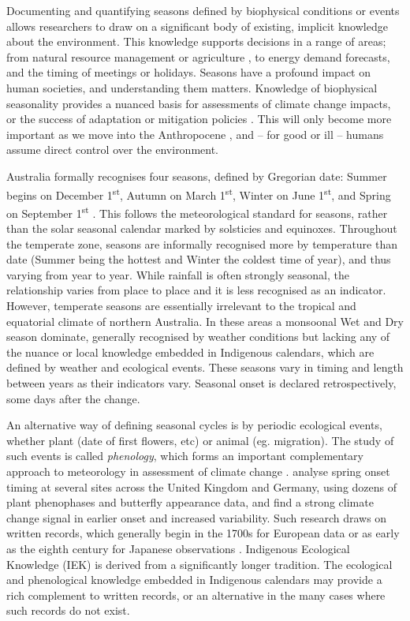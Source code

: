 Documenting and quantifying seasons defined by biophysical conditions
or events allows researchers to draw on a significant body of existing,
implicit knowledge about the environment.
%
This knowledge supports decisions in a range of areas; from natural
resource management or agriculture \citep{woodward2012a,ens2012}, to
energy demand forecasts, and the timing of meetings or holidays.
Seasons have a profound impact on human societies, and understanding
them matters.  Knowledge of biophysical seasonality provides a nuanced
basis for assessments of climate change impacts, or the success of
adaptation or mitigation policies \citep{green2010a,stevenson1996,prober2011}.
This will only become more important as we move into the Anthropocene
\citep{steffen2007}, and -- for good or ill -- humans assume
direct control over the environment.


Australia formally recognises four seasons, defined by Gregorian date:
Summer begins on December 1\textsuperscript{st}, Autumn on March
1\textsuperscript{st}, Winter on June 1\textsuperscript{st}, and Spring
on September 1\textsuperscript{st} \citep{wells2013}. This follows the
meteorological standard for seasons, rather
than the solar seasonal calendar marked by solsticies and equinoxes.
%
Throughout the temperate zone, seasons are informally recognised more by
temperature than date (Summer being the hottest and Winter the coldest time
of year), and thus varying from year to year.  While rainfall is often
strongly seasonal, the relationship varies from place to place and it is
less recognised as an indicator.
%
However, temperate seasons are essentially irrelevant to the tropical and
equatorial climate of northern Australia.  In these areas a monsoonal Wet
and Dry season dominate, generally recognised by weather conditions
but lacking any of the nuance or local knowledge embedded in Indigenous
calendars, which are defined by weather and ecological events.  These
seasons vary in timing and length between years as their indicators vary.
Seasonal onset is declared retrospectively, some days after the change.


An alternative way of defining seasonal cycles is by periodic ecological
events, whether plant (date of first flowers, etc) or animal (eg. migration).
The study of such events is called \textit{phenology}, which forms an
important complementary approach to meteorology in assessment of climate
change \citep[eg.][]{roy2000}.  \citet{menzel2006} analyse spring onset timing
at several sites across the United Kingdom and Germany, using dozens of
plant phenophases and butterfly appearance data, and find a strong climate
change signal in earlier onset and increased variability.  Such research
draws on written records, which generally begin in the 1700s for European
data or as early as the eighth century for Japanese observations \citep{sparks2002}.
%
Indigenous Ecological Knowledge (IEK) is derived from a significantly longer
tradition.  The ecological and phenological knowledge embedded
in Indigenous calendars may provide a rich complement to written records,
or an alternative in the many cases where such records do not exist.


